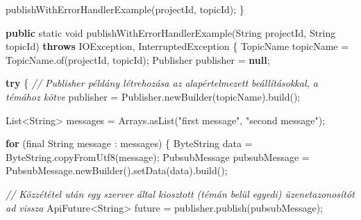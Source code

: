 \documentclass[
]{article}
\newenvironment{Shaded}{}{}
\newcommand{\BuiltInTok}[1]{\textcolor[rgb]{0.00,0.50,0.00}{#1}}
\newcommand{\CommentTok}[1]{\textcolor[rgb]{0.38,0.63,0.69}{\textit{#1}}}
\newcommand{\ControlFlowTok}[1]{\textcolor[rgb]{0.00,0.44,0.13}{\textbf{#1}}}
\newcommand{\DataTypeTok}[1]{\textcolor[rgb]{0.56,0.13,0.00}{#1}}
\newcommand{\FunctionTok}[1]{\textcolor[rgb]{0.02,0.16,0.49}{#1}}
\newcommand{\KeywordTok}[1]{\textcolor[rgb]{0.00,0.44,0.13}{\textbf{#1}}}
\newcommand{\NormalTok}[1]{#1}
\newcommand{\OperatorTok}[1]{\textcolor[rgb]{0.40,0.40,0.40}{#1}}
\newcommand{\StringTok}[1]{\textcolor[rgb]{0.25,0.44,0.63}{#1}}
\begin{document}
\begin{Shaded}
\begin{Highlighting}[]
    \FunctionTok{publishWithErrorHandlerExample}\OperatorTok{(}\NormalTok{projectId}\OperatorTok{,}\NormalTok{ topicId}\OperatorTok{);}
  \OperatorTok{\}}

  \KeywordTok{public} \DataTypeTok{static} \DataTypeTok{void} \FunctionTok{publishWithErrorHandlerExample}\OperatorTok{(}\BuiltInTok{String}\NormalTok{ projectId}\OperatorTok{,} \BuiltInTok{String}\NormalTok{ topicId}\OperatorTok{)}
      \KeywordTok{throws} \BuiltInTok{IOException}\OperatorTok{,} \BuiltInTok{InterruptedException} \OperatorTok{\{}
\NormalTok{    TopicName topicName }\OperatorTok{=}\NormalTok{ TopicName}\OperatorTok{.}\FunctionTok{of}\OperatorTok{(}\NormalTok{projectId}\OperatorTok{,}\NormalTok{ topicId}\OperatorTok{);}
\NormalTok{    Publisher publisher }\OperatorTok{=} \KeywordTok{null}\OperatorTok{;}

    \ControlFlowTok{try} \OperatorTok{\{}
      \CommentTok{// Publisher példány létrehozása az alapértelmezett beállításokkal, a témához kötve}
\NormalTok{      publisher }\OperatorTok{=}\NormalTok{ Publisher}\OperatorTok{.}\FunctionTok{newBuilder}\OperatorTok{(}\NormalTok{topicName}\OperatorTok{).}\FunctionTok{build}\OperatorTok{();}

      \BuiltInTok{List}\OperatorTok{\textless{}}\BuiltInTok{String}\OperatorTok{\textgreater{}}\NormalTok{ messages }\OperatorTok{=} \BuiltInTok{Arrays}\OperatorTok{.}\FunctionTok{asList}\OperatorTok{(}\StringTok{"first message"}\OperatorTok{,} \StringTok{"second message"}\OperatorTok{);}

      \ControlFlowTok{for} \OperatorTok{(}\DataTypeTok{final} \BuiltInTok{String}\NormalTok{ message }\OperatorTok{:}\NormalTok{ messages}\OperatorTok{)} \OperatorTok{\{}
\NormalTok{        ByteString data }\OperatorTok{=}\NormalTok{ ByteString}\OperatorTok{.}\FunctionTok{copyFromUtf8}\OperatorTok{(}\NormalTok{message}\OperatorTok{);}
\NormalTok{        PubsubMessage pubsubMessage }\OperatorTok{=}\NormalTok{ PubsubMessage}\OperatorTok{.}\FunctionTok{newBuilder}\OperatorTok{().}\FunctionTok{setData}\OperatorTok{(}\NormalTok{data}\OperatorTok{).}\FunctionTok{build}\OperatorTok{();}

        \CommentTok{// Közzététel után egy szerver által kiosztott (témán belül egyedi) üzenetazonosítót ad vissza}
\NormalTok{        ApiFuture}\OperatorTok{\textless{}}\BuiltInTok{String}\OperatorTok{\textgreater{}}\NormalTok{ future }\OperatorTok{=}\NormalTok{ publisher}\OperatorTok{.}\FunctionTok{publish}\OperatorTok{(}\NormalTok{pubsubMessage}\OperatorTok{);}


\end{Highlighting}
\end{Shaded}
\end{document}
